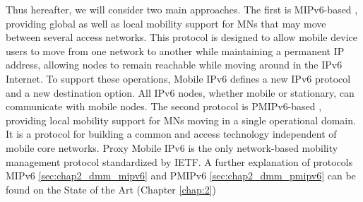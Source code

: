 Thus hereafter, we will consider two main approaches. The first is MIPv6-based \cite{mipv6}, providing global as well as local mobility support for MNs that may move between several access networks. This protocol  is designed to allow mobile device users to move from one network to another while maintaining a permanent IP address, allowing nodes to remain reachable while moving around in the IPv6 Internet. To support these operations, Mobile IPv6 defines a new IPv6 protocol and a new destination option.  All IPv6 nodes, whether mobile or stationary, can communicate with mobile nodes. The second protocol is PMIPv6-based \cite{pmipv6}, providing local mobility support for MNs moving in a single operational domain. It is a protocol for building a common and access technology independent of mobile core networks. Proxy Mobile IPv6 is the only network-based mobility management protocol standardized by IETF. A further explanation of protocols MIPv6 \ref{sec:chap2_dmm_mipv6} and PMIPv6 \ref{sec:chap2_dmm_pmipv6} can be found on the State of the Art (Chapter \ref{chap:2})